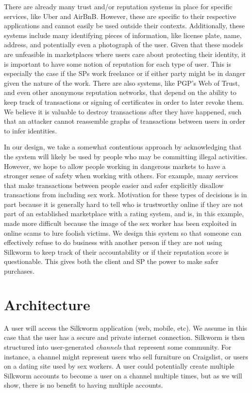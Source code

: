 \documentclass[letterpaper,twocolumn,10pt]{article}
\begin{document}
There are already many trust and/or reputation systems in place for specific services, like Uber and AirBnB. However, these are specific to their respective applications and cannot easily be used outside their contexts. Additionally, these systems include many identifying pieces of information, like license plate, name, address, and potentially even a photograph of the user. Given that these models are unfeasible in marketplaces where users care about protecting their identity, it is important to have some notion of reputation for each type of user. This is especially the case if the SPs work freelance or if either party might be in danger given the nature of the work. There are also systems, like PGP's Web of Trust, and even other anonymous reputation networks, that depend on the ability to keep track of transactions or signing of certificates in order to later revoke them. We believe it is valuable to destroy transactions after they have happened, such that an attacker cannot reassemble graphs of transactions between users in order to infer identities.  

In our design, we take a somewhat contentious approach by acknowledging that the system will likely be used by people who may be committing illegal activities. However, we hope to allow people working in dangerous markets to have a stronger sense of safety when working with others. For example, many services that make transactions between people easier and safer explicitly disallow transactions from including sex work. Motivation for these types of decisions is in part because it is generally hard to tell who is trustworthy online if they are not part of an established marketplace with a rating system, and is, in this example, made more difficult because the image of the sex worker has been exploited in online scams to lure foolish victims. We design this system so that someone can effectively refuse to do business with another person if they are not using Silkworm to keep track of their accountability or if their reputation score is questionable. This gives both the client and SP the power to make safer purchases. 

\section{Architecture}
A user will access the Silkworm application (web, mobile, etc). We assume in this case that the user has a secure and private internet connection.
Silkworm is then structured into user-generated \textit{channels} that represent some community. For instance, a channel might represent users who sell furniture on Craigslist, or users on a dating site used by sex workers. A user could potentially create multiple Silkworm accounts to become a user on a channel multiple times, but as we will show, there is no benefit to having multiple accounts.
\end{document}
